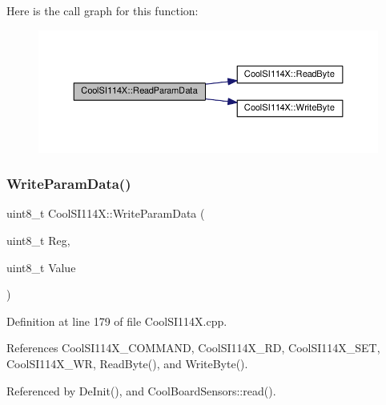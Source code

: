 Here is the call graph for this function\+:\nopagebreak
\begin{figure}[H]
\begin{center}
\leavevmode
\includegraphics[width=350pt]{dd/d67/class_cool_s_i114_x_a33cf431103c722442f6a0cc93848d640_cgraph}
\end{center}
\end{figure}
\mbox{\label{class_cool_s_i114_x_abf45eb10a6de1be16e68a51624fa2608}} 
\subsubsection{\texorpdfstring{Write\+Param\+Data()}{WriteParamData()}}
{\footnotesize\ttfamily uint8\+\_\+t Cool\+S\+I114\+X\+::\+Write\+Param\+Data (\begin{DoxyParamCaption}\item[{uint8\+\_\+t}]{Reg,  }\item[{uint8\+\_\+t}]{Value }\end{DoxyParamCaption})}



Definition at line 179 of file Cool\+S\+I114\+X.\+cpp.



References Cool\+S\+I114\+X\+\_\+\+C\+O\+M\+M\+A\+ND, Cool\+S\+I114\+X\+\_\+\+RD, Cool\+S\+I114\+X\+\_\+\+S\+ET, Cool\+S\+I114\+X\+\_\+\+WR, Read\+Byte(), and Write\+Byte().



Referenced by De\+Init(), and Cool\+Board\+Sensors\+::read().

